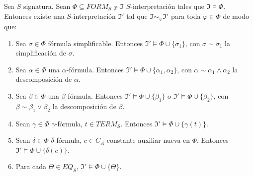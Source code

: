 \begin{prop}
Sea $S$ signatura. Sean $\Phi \subseteq FORM_S$ y $\mathfrak{I}$ $S$-interpretación tales que $\mathfrak{I} \vDash \Phi$. Entonces existe una $S$-interpretación $\mathfrak{I}'$ tal que $\mathfrak{I} \sim_{\varphi} \mathfrak{I}'$ para toda $\varphi \in \Phi$ de modo que:
\begin{enumerate}
    \item Sea $\sigma \in \Phi$ fórmula simplificable. Entonces $\mathfrak{I}' \vDash \Phi \cup \{\sigma_1 \}$, con $\sigma \sim \sigma_1$ la simplificación de $\sigma$.
    \item Sea $\alpha \in \Phi$ una $\alpha$-fórmula. Entonces $\mathfrak{I}' \vDash \Phi \cup \{\alpha_1, \alpha_2 \}$, con $\alpha \sim \alpha_1 \land \alpha_2$ la descomposición de $\alpha$.
    \item Sea $\beta \in \Phi$ una $\beta$-fórmula. Entonces $\mathfrak{I}' \vDash \Phi \cup \{\beta_1\}$ o $\mathfrak{I}' \vDash \Phi \cup \{\beta_2\}$, con $\beta \sim \beta_1 \lor \beta_2$ la descomposición de $\beta$.
    \item Sean $\gamma \in \Phi$ $\gamma$-fórmula, $t \in TERM_S$. Entonces $\mathfrak{I}' \vDash \Phi \cup \{\gamma(t)\}$.
    \item Sean $\delta \in \Phi$ $\delta$-fórmula, $c \in C_A$ constante auxiliar nueva en $\Phi$. Entonces $\mathfrak{I}' \vDash \Phi \cup \{\delta(c)\}$.
    \item Para cada $\Theta \in EQ_S$, $\mathfrak{I}' \vDash \Phi \cup \{ \Theta\}$.
\end{enumerate}
\end{prop}
